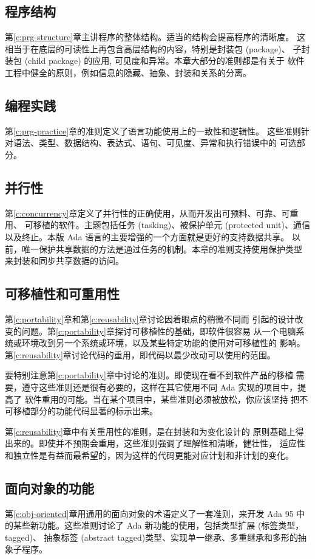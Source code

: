 \subsection{程序结构}
第\ref{c:prg-structure}章主讲程序的整体结构。适当的结构会提高程序的清晰度。
这相当于在底层的可读性上再包含高层结构的内容，特别是封装包 (package)、
子封装包 (child package) 的应用, 可见度和异常。本章大部分的准则都是有关于
软件工程中健全的原则，例如信息的隐藏、抽象、封装和关系的分离。

\subsection{编程实践}
第\ref{c:prg-practice}章的准则定义了语言功能使用上的一致性和逻辑性。
这些准则针对语法、类型、数据结构、表达式、语句、可见度、异常和执行错误中的
可选部分。

\subsection{并行性}
第\ref{c:concurrency}章定义了并行性的正确使用，从而开发出可预料、可靠、可重用、
可移植的软件。主题包括任务 (tasking)、被保护单元 (protected unit)、通信
以及终止。本版 Ada 语言的主要增强的一个方面就是更好的支持数据共享。
以前，唯一保护共享数据的方法是通过任务的机制。本章的准则支持使用保护类型
来封装和同步共享数据的访问。

\subsection{可移植性和可重用性}
第\ref{c:portability}章和第\ref{c:reusability}章讨论因着眼点的稍微不同而
引起的设计改变的问题。第\ref{c:portability}章探讨可移植性的基础，即软件很容易
从一个电脑系统或环境改到另一个系统或环境，以及某些特定功能的使用对可移植性的
影响。第\ref{c:reusability}章讨论代码的重用，即代码以最少改动可以使用的范围。

要特别注意第\ref{c:portability}章中讨论的准则。即使现在看不到软件产品的移植
需要，遵守这些准则还是很有必要的，这样在其它使用不同 Ada 实现的项目中，提高了
软件重用的可能。当在某个项目中，某些准则必须被放松，你应该坚持
把不可移植部分的功能代码显著的标示出来。

第\ref{c:reusability}章中有关重用性的准则，是在封装和为变化设计的
原则基础上得出来的。即使并不预期会重用，这些准则强调了理解性和清晰，健壮性，
适应性和独立性是有益而最希望的，因为这样的代码更能对应计划和非计划的变化。

\subsection{面向对象的功能}
第\ref{c:obj-oriented}章用通用的面向对象的术语定义了一套准则，来开发 Ada 95 中
的某些新功能。这些准则讨论了 Ada 新功能的使用，包括类型扩展 (标签类型，tagged)、
抽象标签 (abstract tagged)类型、实现单一继承、多重继承和多形的抽象子程序。

